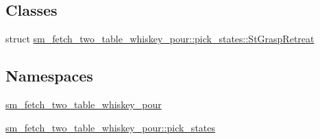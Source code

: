 \subsection*{Classes}
\begin{DoxyCompactItemize}
\item 
struct \hyperlink{structsm__fetch__two__table__whiskey__pour_1_1pick__states_1_1StGraspRetreat}{sm\+\_\+fetch\+\_\+two\+\_\+table\+\_\+whiskey\+\_\+pour\+::pick\+\_\+states\+::\+St\+Grasp\+Retreat}
\end{DoxyCompactItemize}
\subsection*{Namespaces}
\begin{DoxyCompactItemize}
\item 
 \hyperlink{namespacesm__fetch__two__table__whiskey__pour}{sm\+\_\+fetch\+\_\+two\+\_\+table\+\_\+whiskey\+\_\+pour}
\item 
 \hyperlink{namespacesm__fetch__two__table__whiskey__pour_1_1pick__states}{sm\+\_\+fetch\+\_\+two\+\_\+table\+\_\+whiskey\+\_\+pour\+::pick\+\_\+states}
\end{DoxyCompactItemize}
